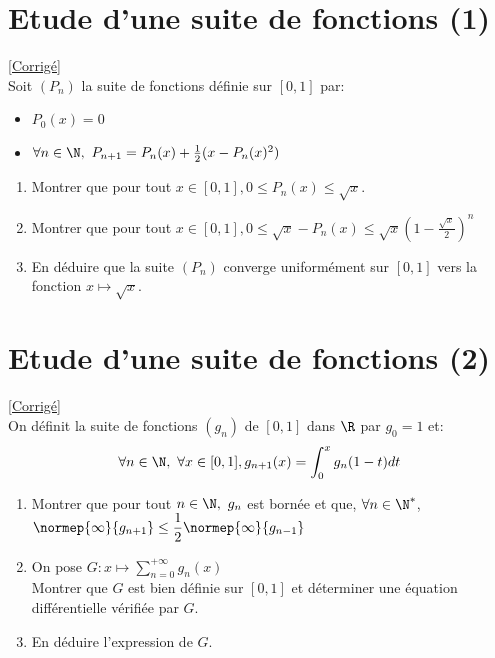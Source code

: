 \documentclass{book}
\begin{document}
	\section{Etude d'une suite de fonctions (1)}
	\textcolor{blue}{\hyperref[sec:etude-dune-suite-de-fonctions-1]{[Corrigé]}}\\
	\label{Etude d'une suite de fonctions 1}
	Soit $(P_n)$ la suite de fonctions définie sur $[0,1]$ par:
	\begin{itemize}[leftmargin=*]
		\item $P_0(x)=0$
		\item $\forall n\in \N,\ P_{n+1}=P_n(x)+\frac{1}{2}(x-P_n(x)^2)$
	\end{itemize}
	\begin{enumerate}[leftmargin=*]
		\item Montrer que pour tout $x\in[0,1], 0\leq P_n(x) \leq \sqrt{x}$.
		\item Montrer que pour tout $x\in[0,1], 0\leq \sqrt{x}-P_n(x)\leq \sqrt{x}\left(1-\displaystyle\frac{\sqrt{x}}{2}\right)^n$
		\item En déduire que la suite $(P_n)$ converge uniformément sur $[0,1]$ vers la fonction $x\mapsto\sqrt{x}$.
	\end{enumerate}
	
	\section{Etude d'une suite de fonctions (2)}
	\textcolor{blue}{\hyperref[sec:etude-dune-suite-de-fonction-2]{[Corrigé]}}\\
	\label{Etude d'une suite de fonctions 2}
	On définit la suite de fonctions $(g_n)$ de $[0,1]$ dans $\R$ par $g_0=1$ et: 
	\\$$\forall n\in\N, \ \forall x\in[0,1], g_{n+1}(x)=\displaystyle\int_0^xg_n(1-t)dt$$
	\begin{enumerate}[leftmargin=*]
		\item Montrer que pour tout $n\in\N, \ g_n$ est bornée et que, $\forall n\in\N^*$, $\normep{\infty}{g_{n+1}}\leq\displaystyle\frac{1}{2}\normep{\infty}{g_{n-1}}$
		\item On pose $G:x\mapsto\displaystyle\sum\limits_{n=0}^{+\infty}g_n(x)$
		\\Montrer que $G$ est bien définie sur $[0,1]$ et déterminer une équation différentielle vérifiée par $G$.
		\item En déduire l'expression de $G$.
	\end{enumerate}
	
\end{document}
